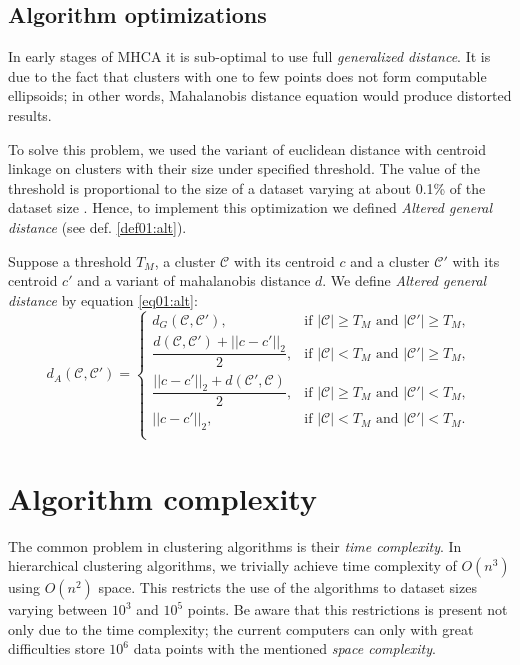 \subsection{Algorithm optimizations}

In early stages of MHCA it is sub-optimal to use full \emph{generalized distance}. It is due to the fact that clusters with one to few points does not form computable ellipsoids; in other words, Mahalanobis distance equation would produce distorted results. 

To solve this problem, we used the variant of euclidean distance with centroid linkage on clusters with their size under specified threshold. The value of the threshold is proportional to the size of a dataset varying at about 0.1\% of the dataset size \cite{fivser2012detection}. Hence, to implement this optimization we defined \emph{Altered general distance} (see def. \ref{def01:alt}).

\begin{defn}
	Suppose a threshold $T_M$, a cluster $\mathcal{C}$ with its centroid $c$ and a cluster $\mathcal{C}'$ with its centroid $c'$ and a variant of mahalanobis distance $d$. We define \emph{Altered general distance} by equation \ref{eq01:alt}:
	\begin{equation}
	d_A(\mathcal{C},\mathcal{C}')=
	\begin{cases}
	d_G(\mathcal{C}, \mathcal{C}'), & \text{if $|\mathcal{C}|\ge T_M$ and $|\mathcal{C}'|\ge T_M$},\\
	\dfrac{d(\mathcal{C}, \mathcal{C}')+||c-c'||_2}{2}, & \text{if $|\mathcal{C}| < T_M$ and $|\mathcal{C}'|\ge T_M$},\\
	\dfrac{||c-c'||_2+d(\mathcal{C}', \mathcal{C})}{2}, & \text{if $|\mathcal{C}|\ge T_M$ and $|\mathcal{C}'|< T_M$},\\
	||c-c'||_2, & \text{if $|\mathcal{C}|< T_M$ and $|\mathcal{C}'|< T_M$}.\\
	\end{cases}
	\label{eq01:alt}
	\end{equation}
	\label{def01:alt}
\end{defn}



\section{Algorithm complexity}

The common problem in clustering algorithms is their \emph{time complexity}. In hierarchical clustering algorithms, we trivially achieve time complexity of $O(n^3)$ using $O(n^2)$ space. This restricts the use of the algorithms to dataset sizes varying between $10^3$ and $10^5$ points. Be aware that this restrictions is present not only due to the time complexity; the current computers can only with great difficulties store $10^6$ data points with the mentioned \emph{space complexity}.


